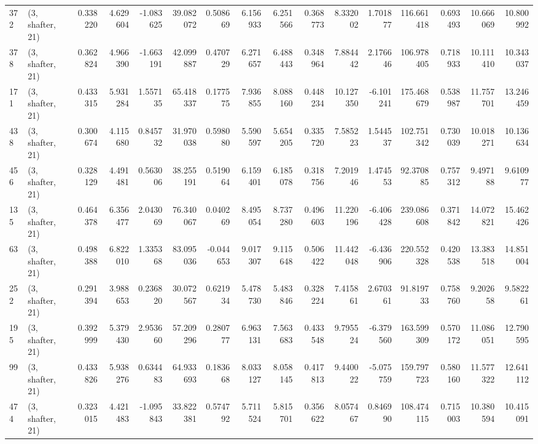 \begin{tabular}{llrrrrrrrrrrrrrr}
372 &  (3, shafter, 21) &   0.338220 &   4.629604 &  -1.083625 &    39.082072 &   0.508669 &   6.156933 &   6.251566 &  0.368773 &   8.332002 &   1.701877 &   116.661418 &  0.693493 &  10.666069 &  10.800992 \\
378 &  (3, shafter, 21) &   0.362824 &   4.966390 &  -1.663191 &    42.099887 &   0.470729 &   6.271657 &   6.488443 &  0.348964 &   7.884442 &   2.176646 &   106.978405 &  0.718933 &  10.111410 &  10.343037 \\
171 &  (3, shafter, 21) &   0.433315 &   5.931284 &   1.557135 &    65.418337 &   0.177575 &   7.936855 &   8.088160 &  0.448234 &  10.127350 &  -6.101241 &   175.468679 &  0.538987 &  11.757701 &  13.246459 \\
438 &  (3, shafter, 21) &   0.300674 &   4.115680 &   0.845732 &    31.970038 &   0.598080 &   5.590597 &   5.654205 &  0.335720 &   7.585223 &   1.544537 &   102.751342 &  0.730039 &  10.018271 &  10.136634 \\
456 &  (3, shafter, 21) &   0.328129 &   4.491481 &   0.563006 &    38.255191 &   0.519064 &   6.159401 &   6.185078 &  0.318756 &   7.201946 &   1.474553 &    92.370885 &  0.757312 &   9.497188 &   9.610977 \\
135 &  (3, shafter, 21) &   0.464378 &   6.356477 &   2.043069 &    76.340067 &   0.040269 &   8.495054 &   8.737280 &  0.496603 &  11.220196 &  -6.406428 &   239.086608 &  0.371842 &  14.072821 &  15.462426 \\
63  &  (3, shafter, 21) &   0.498388 &   6.822010 &   1.335368 &    83.095036 &  -0.044653 &   9.017307 &   9.115648 &  0.506422 &  11.442048 &  -6.436906 &   220.552328 &  0.420538 &  13.383518 &  14.851004 \\
252 &  (3, shafter, 21) &   0.291394 &   3.988653 &   0.236820 &    30.072567 &   0.621934 &   5.478730 &   5.483846 &  0.328224 &   7.415861 &   2.670361 &    91.819733 &  0.758760 &   9.202658 &   9.582261 \\
195 &  (3, shafter, 21) &   0.392999 &   5.379430 &   2.953660 &    57.209296 &   0.280777 &   6.963131 &   7.563683 &  0.433548 &   9.795524 &  -6.379560 &   163.599309 &  0.570172 &  11.086051 &  12.790595 \\
99  &  (3, shafter, 21) &   0.433826 &   5.938276 &   0.634483 &    64.933693 &   0.183668 &   8.033127 &   8.058145 &  0.417813 &   9.440022 &  -5.075759 &   159.797723 &  0.580160 &  11.577322 &  12.641112 \\
474 &  (3, shafter, 21) &   0.323015 &   4.421483 &  -1.095843 &    33.822381 &   0.574792 &   5.711524 &   5.815701 &  0.356622 &   8.057467 &   0.846990 &   108.474115 &  0.715003 &  10.380594 &  10.415091 \\

\end{tabular}
